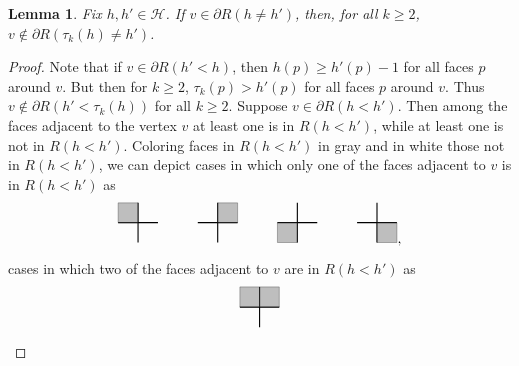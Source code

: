 \documentclass[reqno,11pt]{amsart}
\numberwithin{equation}{section}
\newtheorem{lemma}[proposition]{Lemma}
\theoremstyle{definition}
\begin{document}
\begin{lemma} \label{lem:lift by 4}
    Fix $h,h' \in \mathscr{H}$. If $v \in \partial R(h \neq h')$, then, for all $k\ge 2$, $v\notin \partial R(\tau_k(h) \neq h')$.
\end{lemma}

\begin{proof} Note that if $v\in \partial R(h'<h)$, then $h(p) \ge h'(p)-1$ for all faces $p$ around $v$. But then for $k\ge 2$, $\tau_k(p)> h'(p)$ for all faces $p$ around $v$. Thus $v\notin \partial R(h'<\tau_k(h))$ for all $k\ge 2$. Suppose $v\in \partial R(h<h')$.
    Then among the faces adjacent to the vertex $v$ at least one is in $R(h<h')$, while at least one is not in $R(h<h')$. Coloring faces in $R(h<h')$ in gray and in white those not in $R(h<h')$, we can depict cases in which only one of the faces adjacent to $v$ is in $R(h<h')$ as
    \begin{equation} \label{eq:1face}
        \begin{tikzpicture}
            \draw[thick] (0,0) -- (1,0);
            \draw[thick] (.5,-.5) -- (.5,.5);
            \draw[fill=gray,opacity=.5] (0,0) -- (.5,0) -- (.5,.5) -- (0,.5) -- (0,0);

            \draw[thick,xshift=2cm] (0,0) -- (1,0);
            \draw[thick,xshift=2cm] (.5,-.5) -- (.5,.5);
            \draw[fill=gray,opacity=.5,xshift=2.5cm] (0,0) -- (.5,0) -- (.5,.5) -- (0,.5) -- (0,0);

            \draw[thick,xshift=4cm] (0,0) -- (1,0);
            \draw[thick,xshift=4cm] (.5,-.5) -- (.5,.5);
            \draw[fill=gray,opacity=.5,xshift=4cm,yshift=-.5cm] (0,0) -- (.5,0) -- (.5,.5) -- (0,.5) -- (0,0);

            \draw[thick,xshift=6cm] (0,0) -- (1,0);
            \draw[thick,xshift=6cm] (.5,-.5) -- (.5,.5);
            \draw[fill=gray,opacity=.5,xshift=6.5cm,yshift=-.5cm] (0,0) -- (.5,0) -- (.5,.5) -- (0,.5) -- (0,0);
        \end{tikzpicture}
        ,
    \end{equation}
    cases in which two of the faces adjacent to $v$ are in $R(h<h')$ as
    \begin{equation} \label{eq:2faces}
        \begin{tikzpicture}
            \draw[thick] (0,0) -- (1,0);
            \draw[thick] (.5,-.5) -- (.5,.5);
            \draw[fill=gray,opacity=.5] (0,0) -- (.5,0) -- (.5,.5) -- (0,.5) -- (0,0);
            \draw[fill=gray,opacity=.5,xshift=.5cm] (0,0) -- (.5,0) -- (.5,.5) -- (0,.5) -- (0,0);


\end{tikzpicture}
\end{equation}
\end{proof}
\end{document}
